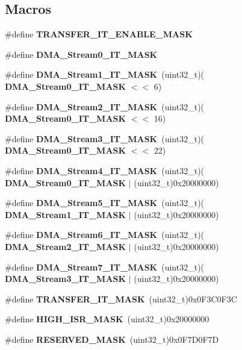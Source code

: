 \subsection*{Macros}
\begin{DoxyCompactItemize}
\item 
\#define \textbf{ T\+R\+A\+N\+S\+F\+E\+R\+\_\+\+I\+T\+\_\+\+E\+N\+A\+B\+L\+E\+\_\+\+M\+A\+SK}
\item 
\#define \textbf{ D\+M\+A\+\_\+\+Stream0\+\_\+\+I\+T\+\_\+\+M\+A\+SK}
\item 
\#define \textbf{ D\+M\+A\+\_\+\+Stream1\+\_\+\+I\+T\+\_\+\+M\+A\+SK}~(uint32\+\_\+t)(\textbf{ D\+M\+A\+\_\+\+Stream0\+\_\+\+I\+T\+\_\+\+M\+A\+SK} $<$$<$ 6)
\item 
\#define \textbf{ D\+M\+A\+\_\+\+Stream2\+\_\+\+I\+T\+\_\+\+M\+A\+SK}~(uint32\+\_\+t)(\textbf{ D\+M\+A\+\_\+\+Stream0\+\_\+\+I\+T\+\_\+\+M\+A\+SK} $<$$<$ 16)
\item 
\#define \textbf{ D\+M\+A\+\_\+\+Stream3\+\_\+\+I\+T\+\_\+\+M\+A\+SK}~(uint32\+\_\+t)(\textbf{ D\+M\+A\+\_\+\+Stream0\+\_\+\+I\+T\+\_\+\+M\+A\+SK} $<$$<$ 22)
\item 
\#define \textbf{ D\+M\+A\+\_\+\+Stream4\+\_\+\+I\+T\+\_\+\+M\+A\+SK}~(uint32\+\_\+t)(\textbf{ D\+M\+A\+\_\+\+Stream0\+\_\+\+I\+T\+\_\+\+M\+A\+SK} $\vert$ (uint32\+\_\+t)0x20000000)
\item 
\#define \textbf{ D\+M\+A\+\_\+\+Stream5\+\_\+\+I\+T\+\_\+\+M\+A\+SK}~(uint32\+\_\+t)(\textbf{ D\+M\+A\+\_\+\+Stream1\+\_\+\+I\+T\+\_\+\+M\+A\+SK} $\vert$ (uint32\+\_\+t)0x20000000)
\item 
\#define \textbf{ D\+M\+A\+\_\+\+Stream6\+\_\+\+I\+T\+\_\+\+M\+A\+SK}~(uint32\+\_\+t)(\textbf{ D\+M\+A\+\_\+\+Stream2\+\_\+\+I\+T\+\_\+\+M\+A\+SK} $\vert$ (uint32\+\_\+t)0x20000000)
\item 
\#define \textbf{ D\+M\+A\+\_\+\+Stream7\+\_\+\+I\+T\+\_\+\+M\+A\+SK}~(uint32\+\_\+t)(\textbf{ D\+M\+A\+\_\+\+Stream3\+\_\+\+I\+T\+\_\+\+M\+A\+SK} $\vert$ (uint32\+\_\+t)0x20000000)
\item 
\#define \textbf{ T\+R\+A\+N\+S\+F\+E\+R\+\_\+\+I\+T\+\_\+\+M\+A\+SK}~(uint32\+\_\+t)0x0\+F3\+C0\+F3C
\item 
\#define \textbf{ H\+I\+G\+H\+\_\+\+I\+S\+R\+\_\+\+M\+A\+SK}~(uint32\+\_\+t)0x20000000
\item 
\#define \textbf{ R\+E\+S\+E\+R\+V\+E\+D\+\_\+\+M\+A\+SK}~(uint32\+\_\+t)0x0\+F7\+D0\+F7D
\end{DoxyCompactItemize}
